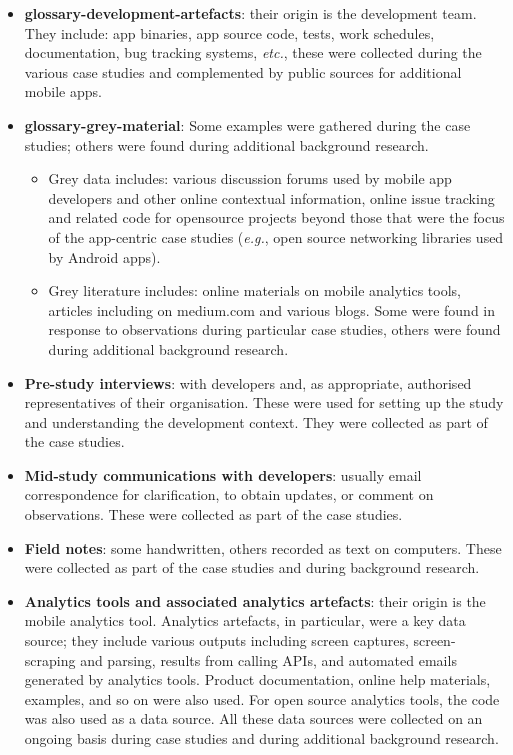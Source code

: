 \begin{itemize}
    \itemsep0em
    \item \textbf{\Gls{glossary-development-artefacts}}: their origin is the development team. They include: app binaries, app source code, tests, work schedules, documentation, bug tracking systems, \textit{etc.}, these were collected during the various case studies and complemented by public sources for additional mobile apps. 
    \item \textbf{\Gls{glossary-grey-material}}: Some examples were gathered during the case studies; others were found during additional background research.
    \begin{itemize}
                \item Grey data includes: various discussion forums used by mobile app developers and other online contextual information, online issue tracking and related code for opensource projects beyond those that were the focus of the app-centric case studies (\textit{e.g.}, open source networking libraries used by Android apps). 
                \item Grey literature includes: online materials on mobile analytics tools, articles including on medium.com and various blogs. Some were found in response to observations during particular case studies, others were found during additional background research.
    \end{itemize}
    \item \textbf{Pre-study interviews}: with developers and, as appropriate, authorised representatives of their organisation. These were used for setting up the study and understanding the development context. They were collected as part of the case studies.
    \item \textbf{Mid-study communications with developers}: usually email correspondence for clarification, to obtain updates, or comment on observations. These were collected as part of the case studies.
    \item \textbf{Field notes}: some handwritten, others recorded as text on computers. These were collected as part of the case studies and during background research.
    \item \textbf{Analytics tools and associated analytics artefacts}: their origin is the mobile analytics tool. Analytics artefacts, in particular, were a key data source; they include various outputs including screen captures, screen-scraping and parsing, results from calling APIs, and automated emails generated by analytics tools. Product documentation, online help materials, examples, and so on were also used. For open source analytics tools, the code was also used as a data source. All these data sources were collected on an ongoing basis during case studies and during additional background research.
\end{itemize}

